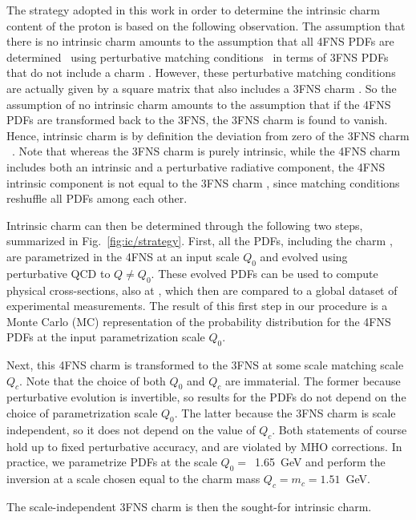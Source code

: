 
The strategy adopted in this work in order to
determine the intrinsic charm content of the proton is 
based on the following
observation.
%
The assumption that there is no intrinsic charm
amounts to the assumption
that all 4FNS PDFs are determined~\cite{Collins:1986mp} using
perturbative matching conditions~\cite{pdfnnlo} in terms of 
3FNS PDFs
that do not include
a charm \pdf.
%
However, these perturbative matching conditions are
actually given by a square matrix that also includes a 3FNS charm
\pdf.
%
So the assumption of no intrinsic charm amounts to the assumption
that if the 4FNS PDFs are transformed back to the 3FNS, the 3FNS charm
\pdf is found to vanish. Hence, intrinsic charm is by definition the
deviation from zero of the 3FNS charm \pdf~\cite{Ball:2015dpa}. Note
that whereas the 3FNS charm \pdf is purely intrinsic, while the 4FNS
charm \pdf includes both an intrinsic and a perturbative
 radiative component, the
4FNS intrinsic component is not equal to the 3FNS charm \pdf, since
matching conditions reshuffle all PDFs among each other. 

Intrinsic charm can then be determined through the following two steps,
summarized in Fig.~\ref{fig:ic/strategy}. 
First, all the PDFs, including the charm \pdf, are parametrized 
in the 4FNS at an input scale $Q_0$ and evolved 
using \nnlo perturbative QCD to   $Q \not = Q_0$.
%
These evolved PDFs can be used to 
compute physical cross-sections, also at \nnlo, which then are
compared to a global dataset of experimental measurements.
%
The result of this first step in our procedure is 
a Monte Carlo (MC) representation
of the probability distribution for the 4FNS PDFs at the input
parametrization scale $Q_0$.

Next, this 4FNS charm \pdf is transformed to the 3FNS at some scale matching scale
$Q_c$.
%
Note that the choice of both $Q_0$ and $Q_c$ are immaterial. The former
because perturbative evolution is invertible, so
results for the PDFs do not depend on the choice of
parametrization scale $Q_0$. The latter because 
the 3FNS charm is scale independent, so it does not depend on the
value of $Q_c$.
Both statements of course hold up to fixed perturbative accuracy, and
are violated by MHO corrections.
%
In practice, we parametrize PDFs at the scale
$Q_0=$~1.65~GeV and perform the inversion at a scale
chosen equal to the charm mass $Q_c=m_c=1.51$~GeV.

The scale-independent 3FNS charm \pdf is then the sought-for intrinsic
charm.

